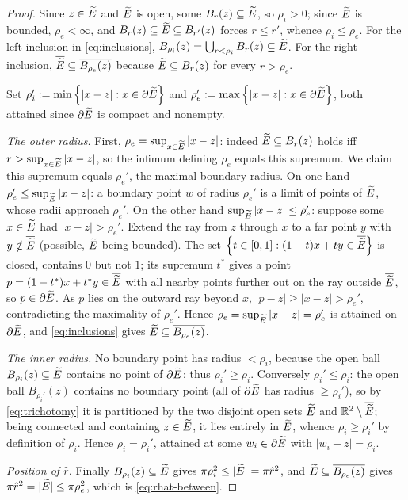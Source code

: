 \begin{proof}
Since $z\in\widetilde{E}$ and $\widetilde{E}$ is open, some $B_r(z)\subseteq\widetilde{E}$, so
$\rho_i>0$; since $\widetilde{E}$ is bounded, $\rho_e<\infty$, and $B_r(z)\subseteq
\widetilde{E}\subseteq B_{r'}(z)$ forces $r\le r'$, whence $\rho_i\le\rho_e$. For the
left inclusion in \eqref{eq:inclusions}, $B_{\rho_i}(z)=\bigcup_{r<\rho_i}
B_r(z)\subseteq\widetilde{E}$. For the right inclusion, $\overline{\widetilde{E}}
\subseteq\overline{B_{\rho_e}(z)}$ because $\widetilde{E}\subseteq B_{r}(z)$ for
every $r>\rho_e$.

Set $\rho_i':=\min\left\{|x-z|:x\in\partial\widetilde{E}\right\}$ and $\rho_e':=\max\left\{|x-z|:
x\in\partial\widetilde{E}\right\}$, both attained since $\partial\widetilde{E}$ is compact and
nonempty.

\emph{The outer radius.} First, $\rho_e=\sup_{x\in\widetilde{E}}|x-z|$: indeed
$\widetilde{E}\subseteq B_r(z)$ holds iff $r>\sup_{x\in\widetilde{E}}|x-z|$, so the infimum
defining $\rho_e$ equals this supremum. We claim this supremum equals
$\rho_e'$, the maximal boundary radius. On one hand $\rho_e'\le\sup_{\widetilde{E}}
|x-z|$: a boundary point $w$ of radius $\rho_e'$ is a limit of points of
$\widetilde{E}$, whose radii approach $\rho_e'$. On the other hand $\sup_{\widetilde{E}}|x-z|
\le\rho_e'$: suppose some $x\in\widetilde{E}$ had $|x-z|>\rho_e'$. Extend the ray
from $z$ through $x$ to a far point $y$ with $y\notin\overline{\widetilde{E}}$
(possible, $\widetilde{E}$ being bounded). The set $\left\{t\in[0,1]:(1-t)x+ty\in
\overline{\widetilde{E}}\right\}$ is closed, contains $0$ but not $1$; its supremum $t^*$
gives a point $p=(1-t^*)x+t^*y\in\overline{\widetilde{E}}$ with all nearby points
further out on the ray outside $\overline{\widetilde{E}}$, so $p\in\partial\widetilde{E}$.
As $p$ lies on the outward ray beyond $x$, $|p-z|\ge|x-z|>\rho_e'$,
contradicting the maximality of $\rho_e'$. Hence $\rho_e=\sup_{\widetilde{E}}|x-z|
=\rho_e'$ is attained on $\partial\widetilde{E}$, and \eqref{eq:inclusions} gives
$\widetilde{E}\subseteq\overline{B_{\rho_e}(z)}$.

\emph{The inner radius.} No boundary point has radius $<\rho_i$, because the
open ball $B_{\rho_i}(z)\subseteq\widetilde{E}$ contains no point of $\partial\widetilde{E}$;
thus $\rho_i'\ge\rho_i$. Conversely $\rho_i'\le\rho_i$: the open ball
$B_{\rho_i'}(z)$ contains no boundary point (all of $\partial\widetilde{E}$ has
radius $\ge\rho_i'$), so by \eqref{eq:trichotomy} it is partitioned by the
two disjoint open sets $\widetilde{E}$ and $\mathbb{R}^2\setminus\overline{\widetilde{E}}$; being
connected and containing $z\in\widetilde{E}$, it lies entirely in $\widetilde{E}$, whence
$\rho_i\ge\rho_i'$ by definition of $\rho_i$. Hence $\rho_i=\rho_i'$,
attained at some $w_i\in\partial\widetilde{E}$ with $|w_i-z|=\rho_i$.

\emph{Position of $\hat r$.} Finally $B_{\rho_i}(z)\subseteq\widetilde{E}$ gives
$\pi\rho_i^2\le|\widetilde{E}|=\pi\hat r^2$, and $\widetilde{E}\subseteq\overline{B_{\rho_e}
(z)}$ gives $\pi\hat r^2=|\widetilde{E}|\le\pi\rho_e^2$, which is
\eqref{eq:rhat-between}.
\end{proof}

